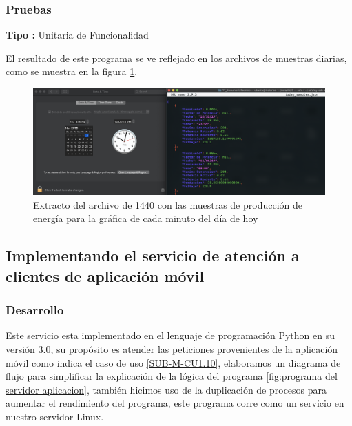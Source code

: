 \subsubsection{Pruebas}
\textbf{Tipo :} Unitaria de Funcionalidad \\ \newline

El resultado de este programa se ve reflejado en los archivos de muestras diarias, como se muestra en la figura \ref{fig:muestras diarias}.

\begin{figure}[H]
	\centering
	\includegraphics[scale=.3]{Capitulo5/images/today.png}
	\caption{Extracto del archivo de 1440 con las muestras de producción de energía para la gráfica de cada minuto del día de hoy}
	\label{fig:muestras diarias}
\end{figure} 

\subsection{Implementando el servicio de atención a clientes de aplicación móvil}

\subsubsection{Desarrollo}

Este servicio esta implementado en el lenguaje de programación Python en su versión 3.0, su propósito es atender las peticiones provenientes de la aplicación móvil como indica el caso de uso \ref{SUB-M-CU1.10}, elaboramos un diagrama de flujo para simplificar la explicación de la lógica del programa \ref{fig:programa del servidor aplicacion}, también hicimos uso de la duplicación de procesos para aumentar el rendimiento del programa, este programa corre como un servicio en nuestro servidor Linux.

